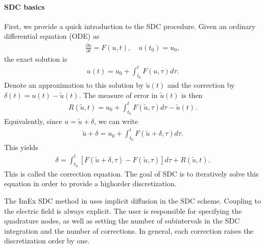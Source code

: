 \documentclass[letterpaper,10pt,english]{sphinxmanual}
\begin{document}
\paragraph{SDC basics}
\label{\detokenize{Applications/CdrPlasmaModel:sdc-basics}}
First, we provide a quick introduction to the SDC procedure.
Given an ordinary differential equation (ODE) as
\begin{equation*}
\begin{split}\frac{\partial u}{\partial t} = F(u,t), \quad u(t_0) = u_0,\end{split}
\end{equation*}
the exact solution is
\begin{equation*}
\begin{split}u(t) = u_0 + \int_{t_0}^tF\left(u,\tau\right)d\tau.\end{split}
\end{equation*}
Denote an approximation to this solution by \(\widetilde{u}(t)\) and the correction by \(\delta(t) = u(t) - \widetilde{u}(t)\). The measure of error in \(\widetilde{u}(t)\) is then
\begin{equation*}
\begin{split}R(\widetilde{u}, t) = u_0 + \int_{t_0}^tF(\widetilde{u}, \tau)d\tau - \widetilde{u}(t).\end{split}
\end{equation*}
Equivalently, since \(u = \widetilde{u} + \delta\), we can write
\begin{equation*}
\begin{split}\widetilde{u} + \delta = u_0 + \int_{t_0}^t F\left(\widetilde{u}+\delta, \tau\right)d\tau.\end{split}
\end{equation*}
This yields
\begin{equation*}
\begin{split}\delta = \int_{t_0}^t\left[F\left(\widetilde{u}+\delta, \tau\right) - F\left(\widetilde{u}, \tau\right)\right]d\tau + R\left(\widetilde{u},t\right).\end{split}
\end{equation*}
This is called the correction equation. The goal of SDC is to iteratively solve this equation in order to provide a high\sphinxhyphen{}order discretization.

The ImEx SDC method in  uses implicit diffusion in the SDC scheme.
Coupling to the electric field is always explicit.
The user is responsible for specifying the quadrature nodes, as well as setting the number of sub\sphinxhyphen{}intervals in the SDC integration and the number of corrections.
In general, each correction raises the discretization order by one.
\end{document}
